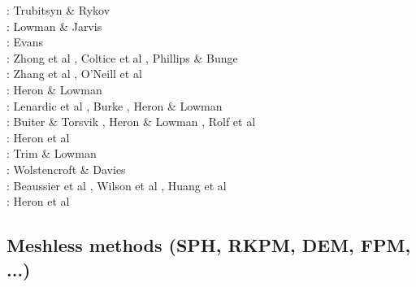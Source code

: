 \begin{scriptsize}
\nineteenninetyfive: Trubitsyn \& Rykov \cite{trry95}\\
\nineteenninetynine: Lowman \& Jarvis \cite{loja99}\\
\twothousandthree: Evans \cite{evan03}\\
\twothousandseven: Zhong et al \cite{zhzl07}, Coltice et al \cite{copb07}, Phillips \& Bunge \cite{phbu07}\\
\twothousandnine: Zhang et al \cite{zhzm09}, O'Neill et al \cite{onlj09}\\
\twothousandten: Heron \& Lowman \cite{helo10}\\
\twothousandeleven: Lenardic et al \cite{lemj11}, Burke \cite{burk11}, Heron \& Lowman \cite{helo11}\\
\twothousandfourteen: Buiter \& Torsvik \cite{buto14}, Heron \& Lowman \cite{helo14}, 
                      Rolf et al \cite{roct14}\\
\twothousandfifteen: Heron et al \cite{hels15}\\
\twothousandsixteen: Trim \& Lowman \cite{trlo16}\\
\twothousandseventeen: Wolstencroft \& Davies \cite{woda17}\\
\twothousandnineteen: Beaussier et al \cite{begb19}, Wilson et al \cite{wihb19}, Huang et al \cite{huzl19}\\
\twothousandtwenty: Heron et al \cite{hemn20}
\end{scriptsize}

\subsection{Meshless methods (SPH, RKPM, DEM, FPM, ...)}

